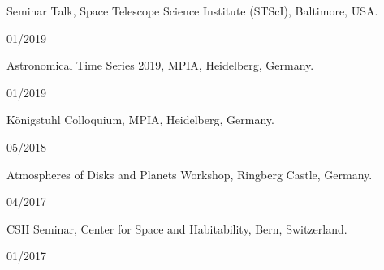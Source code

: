 \documentclass[12pt, a4paper]{article} %
\begin{document}
\begin{minipage}[t]{0.7\textwidth}
\begin{flushleft}%
  \setlength{\leftskip}{0.2cm}%
Seminar Talk, Space Telescope Science Institute (STScI), Baltimore, USA.
\end{flushleft}
\end{minipage}
\begin{minipage}[t]{0.3\textwidth}
\hfill 01/2019
\end{minipage}
\vspace{0.2cm}

\begin{minipage}[t]{0.7\textwidth}
\begin{flushleft}%
  \setlength{\leftskip}{0.2cm}%
Astronomical Time Series 2019, MPIA, Heidelberg, Germany.
\end{flushleft}
\end{minipage}
\begin{minipage}[t]{0.3\textwidth}
\hfill 01/2019
\end{minipage}
\vspace{0.2cm}

\begin{minipage}[t]{0.7\textwidth}
\begin{flushleft}%
  \setlength{\leftskip}{0.2cm}%
Königstuhl Colloquium, MPIA, Heidelberg, Germany.
\end{flushleft}
\end{minipage}
\begin{minipage}[t]{0.3\textwidth}
\hfill 05/2018
\end{minipage}
\vspace{0.2cm}

\begin{minipage}[t]{0.7\textwidth}
\begin{flushleft}%
  \setlength{\leftskip}{0.2cm}%
Atmospheres of Disks and Planets Workshop, Ringberg Castle, Germany.
\end{flushleft}
\end{minipage}
\begin{minipage}[t]{0.3\textwidth}
\hfill 04/2017
\end{minipage}
\vspace{0.2cm}

\begin{minipage}[t]{0.7\textwidth}
\begin{flushleft}%
  \setlength{\leftskip}{0.2cm}%
CSH Seminar, Center for Space and Habitability, Bern, Switzerland.
\end{flushleft}
\end{minipage}
\begin{minipage}[t]{0.3\textwidth}
\hfill 01/2017
\end{minipage}
\vspace{0.2cm}
\end{document}
